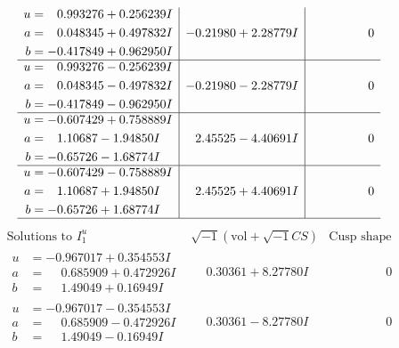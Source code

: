 \documentclass[1p]{elsarticle_modified}
\theoremstyle{definition}
\newcommand{\I}{\sqrt{-1}}
\begin{document}
$$\begin{array}{c|c|c}
\begin{aligned}
u &= \phantom{-}0.993276 + 0.256239 I \\
a &= \phantom{-}0.048345 + 0.497832 I \\
b &= -0.417849 + 0.962950 I\end{aligned}
 & -0.21980 + 2.28779 I & \phantom{-0.000000 } 0 \\ \hline\begin{aligned}
u &= \phantom{-}0.993276 - 0.256239 I \\
a &= \phantom{-}0.048345 - 0.497832 I \\
b &= -0.417849 - 0.962950 I\end{aligned}
 & -0.21980 - 2.28779 I & \phantom{-0.000000 } 0 \\ \hline\begin{aligned}
u &= -0.607429 + 0.758889 I \\
a &= \phantom{-}1.10687 - 1.94850 I \\
b &= -0.65726 - 1.68774 I\end{aligned}
 & \phantom{-}2.45525 - 4.40691 I & \phantom{-0.000000 } 0 \\ \hline\begin{aligned}
u &= -0.607429 - 0.758889 I \\
a &= \phantom{-}1.10687 + 1.94850 I \\
b &= -0.65726 + 1.68774 I\end{aligned}
 & \phantom{-}2.45525 + 4.40691 I & \phantom{-0.000000 } 0\\
 \hline 
 \end{array}$$\newpage$$\begin{array}{c|c|c}  
\text{Solutions to }I^u_{1}& \I (\text{vol} + \sqrt{-1}CS) & \text{Cusp shape}\\
 \hline 
\begin{aligned}
u &= -0.967017 + 0.354553 I \\
a &= \phantom{-}0.685909 + 0.472926 I \\
b &= \phantom{-}1.49049 + 0.16949 I\end{aligned}
 & \phantom{-}0.30361 + 8.27780 I & \phantom{-0.000000 } 0 \\ \hline\begin{aligned}
u &= -0.967017 - 0.354553 I \\
a &= \phantom{-}0.685909 - 0.472926 I \\
b &= \phantom{-}1.49049 - 0.16949 I\end{aligned}
 & \phantom{-}0.30361 - 8.27780 I & \phantom{-0.000000 } 0 \\ \hline\begin{aligned}

\end{aligned}
\end{array}$$
\end{document}
